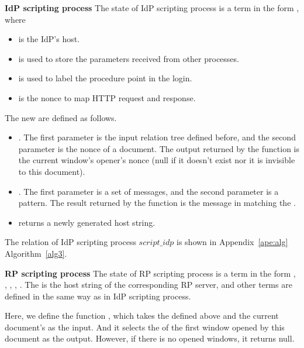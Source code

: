 \vspace{1mm}
\noindent\textbf{IdP scripting process}
The state of IdP scripting process  is a term in the form , where
\begin{itemize}
\setlength\itemsep{-2pt}
\item {} is the IdP's host.
\item {} is used to store the parameters received from other processes.
\item {} is used to label the procedure point in the login.
\item {} is the nonce to map HTTP request and response.
\end{itemize}
The new  are defined as follows.
\begin{itemize}
\setlength\itemsep{-2pt}
 \item {}. The first parameter is the input relation tree defined before, and the second parameter is the nonce of a document. The output returned by the function is the current window's opener's nonce (null if it doesn't exist nor it is invisible to this document).
  \item {}. The first parameter is a set of messages, and the second parameter is a pattern. The result returned by the function is the message in  matching the .
  \item {} returns a newly generated host string.
\end{itemize}
The relation of IdP scripting process $script\_idp$ is shown in Appendix~\ref{ape:alg} Algorithm~\ref{alg3}.




\vspace{1mm}
\noindent\textbf{RP scripting process}
The state of RP scripting process  is a term in the form , , , , . The  is the host string of the corresponding RP server, and other terms are defined in the same way as in IdP scripting process.

Here, we define the function , which takes the  defined above and the current document's  as the input. And it selects the  of the first window opened by this document as the output. However, if there is no opened windows, it returns  null.

